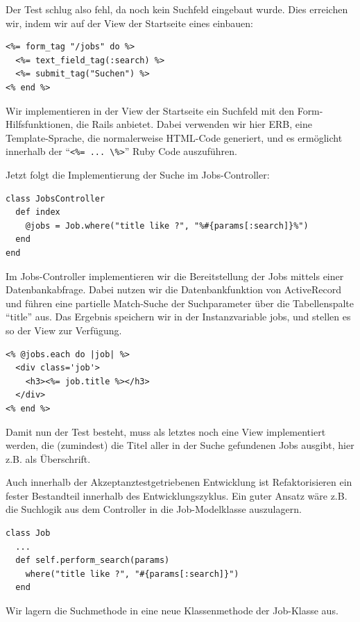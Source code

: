 \tddred
Der Test schlug also fehl, da noch kein Suchfeld eingebaut wurde. Dies erreichen wir, indem wir auf der View der Startseite eines einbauen:

\begin{lstlisting}
<%= form_tag "/jobs" do %>
  <%= text_field_tag(:search) %>
  <%= submit_tag("Suchen") %>
<% end %> 
\end{lstlisting}
Wir implementieren in der View der Startseite ein Suchfeld mit den Form-Hilfsfunktionen, die Rails anbietet. Dabei verwenden wir hier ERB, eine Template-Sprache, die normalerweise HTML-Code generiert, und es ermöglicht innerhalb der "`\verb|<%= ... \%>|"' Ruby Code auszuführen.

Jetzt folgt die Implementierung der Suche im Jobs-Controller:

\begin{lstlisting}
class JobsController
  def index
    @jobs = Job.where("title like ?", "%#{params[:search]}%")
  end
end
\end{lstlisting}
Im Jobs-Controller implementieren wir die Bereitstellung der Jobs mittels einer Datenbankabfrage. Dabei nutzen wir die Datenbankfunktion von ActiveRecord und führen eine partielle Match-Suche der Suchparameter über die Tabellenspalte "`title"' aus. Das Ergebnis speichern wir in der Instanzvariable jobs, und stellen es so der View zur Verfügung.

\begin{lstlisting}
<% @jobs.each do |job| %>
  <div class='job'>
    <h3><%= job.title %></h3>
  </div>
<% end %>
\end{lstlisting}

Damit nun der Test besteht, muss als letztes noch eine View implementiert werden, die (zumindest) die Titel aller in der Suche gefundenen Jobs ausgibt, hier z.B. als Überschrift.
\tddgreen


Auch innerhalb der Akzeptanztestgetriebenen Entwicklung ist Refaktorisieren ein fester Bestandteil innerhalb des Entwicklungszyklus.
Ein guter Ansatz wäre z.B. die Suchlogik aus dem Controller in die Job-Modelklasse auszulagern.

\tddrefactor
\begin{lstlisting}
class Job
  ...
  def self.perform_search(params)
    where("title like ?", "#{params[:search]}") 
  end
\end{lstlisting}
Wir lagern die Suchmethode in eine neue Klassenmethode der Job-Klasse aus.

